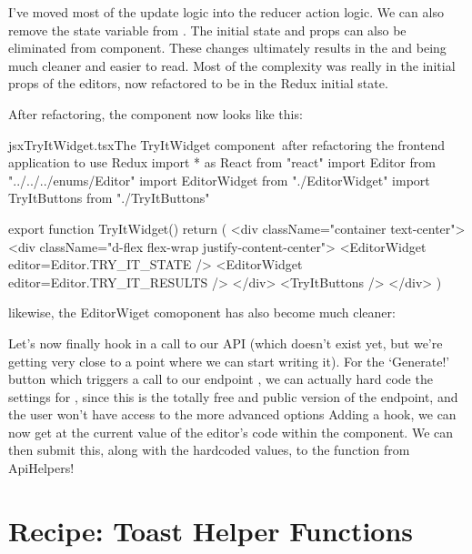 \documentclass[paper=6in:9in,pagesize=pdftex,headinclude=on,footinclude=on,12pt]{scrbook}
\begin{document}
I've moved most of the  update logic into the reducer action logic. We can also remove the state variable from . The initial state and props can also be eliminated from  component. These changes ultimately results in the  and  being much cleaner and easier to read. Most of the complexity was really in the initial props of the editors, now refactored to be in the Redux initial state.

After refactoring, the  component now looks like this:

\begin{codeInput}{jsx}{TryItWidget.tsx}{The TryItWidget component\, after refactoring the frontend application to use Redux}
import * as React from "react"
import Editor from "../../../enums/Editor"
import { EditorWidget } from "./EditorWidget"
import { TryItButtons } from "./TryItButtons"

export function TryItWidget() {
  return (
    <div className="container text-center">
      <div className="d-flex flex-wrap justify-content-center">
        <EditorWidget editor={Editor.TRY_IT_STATE} />
        <EditorWidget editor={Editor.TRY_IT_RESULTS} />
      </div>
      <TryItButtons />
    </div>
  )
}
\end{codeInput}

likewise, the EditorWiget comoponent has also become much cleaner:


Let's now finally hook in a call to our API (which doesn't exist yet, but we're getting very close to a point where we can start writing it). For the `Generate!' button which triggers a call to our endpoint , we can actually hard code the settings for , since this is the totally free and public version of the endpoint, and the user won't have access to the more advanced options Adding a  hook, we can now get at the current value of the editor's code within the  component. We can then submit this, along with the hardcoded values, to the  function from ApiHelpers!

\section{Recipe: Toast Helper Functions}
\end{document}
